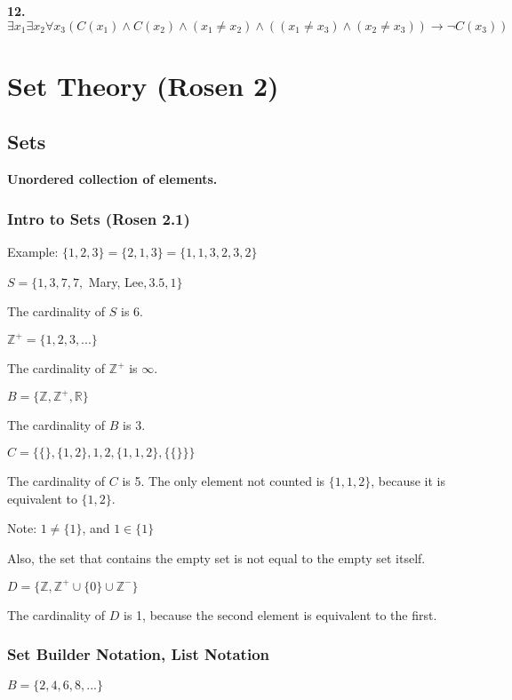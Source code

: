 \documentclass[english,openany]{book}
\begin{document}
	\textbf{12.} $\exists x_1 \exists x_2  \forall x_3 ( C(x_1) \wedge C(x_2) \wedge (x_1 \neq x_2) \wedge ((x_1 \neq x_3) \wedge (x_2 \neq x_3)) \rightarrow \neg C(x_3))$


	\chapter{Set Theory (Rosen 2)}

	\section{Sets}

	\textbf{Unordered collection of elements.}

	\subsection{Intro to Sets (Rosen 2.1)}

	Example: $\{1,2,3\} = \{2,1,3\} = \{1,1,3,2,3,2\}$\newline

	$S = \{1,3,7,7,$ Mary, Lee$,3.5,1\}$

	The cardinality of $S$ is 6.

	$\mathbb Z^+ = \{ 1,2,3,... \}$

	The cardinality of $\mathbb Z^+$ is $\infty$.

	$B = \{\mathbb Z, \mathbb Z^+, \mathbb R \}$

	The cardinality of $B$ is 3.

	$C = \{ \{\}, \{1,2\},1,2,\{1,1,2 \}, \{\{\}\} \}$

	The cardinality of $C$ is 5. The only element not counted is $\{1,1,2 \}$, because it is equivalent to $\{1,2\}$.

	Note: $1 \neq \{1\}$, and $1 \in \{1\}$

	Also, the set that contains the empty set is not equal to the empty set itself.

	$D = \{\mathbb Z, \mathbb Z^+ \cup \{0\} \cup \mathbb Z^- \}$

	The cardinality of $D$ is 1, because the second element is equivalent to the first.\newline

	\noindent
	\subsection{Set Builder Notation, List Notation}

	$B = \{2,4,6,8,...\}$
\end{document}
